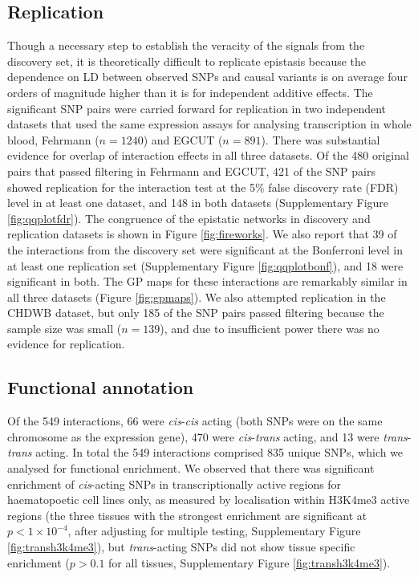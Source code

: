 \documentclass{article}
\begin{document}
\subsection{Replication}
Though a necessary step to establish the veracity of the signals from the discovery set, it is theoretically difficult to replicate epistasis because the dependence on LD between observed SNPs and causal variants is on average four orders of magnitude higher than it is for independent additive effects. The significant SNP pairs were carried forward for replication in two independent datasets that used the same expression assays for analysing transcription in whole blood, Fehrmann ($n=1240$) and EGCUT ($n=891$). There was substantial evidence for overlap of interaction effects in all three datasets. Of the 480 original pairs that passed filtering in Fehrmann and EGCUT, 421 of the SNP pairs showed replication for the interaction test at the 5\% false discovery rate (FDR) level in at least one dataset, and 148 in both datasets (Supplementary Figure \ref{fig:qqplotfdr}). The congruence of the epistatic networks in discovery and replication datasets is shown in Figure \ref{fig:fireworks}. We also report that 39 of the interactions from the discovery set were significant at the Bonferroni level in at least one replication set (Supplementary Figure \ref{fig:qqplotbonf}), and 18 were significant in both. The GP maps for these interactions are remarkably similar in all three datasets (Figure \ref{fig:gpmaps}). We also attempted replication in the CHDWB dataset, but only 185 of the SNP pairs passed filtering because the sample size was small ($n=139$), and due to insufficient power there was no evidence for replication.


\subsection{Functional annotation}
Of the 549 interactions, 66 were \emph{cis}-\emph{cis} acting (both SNPs were on the same chromosome as the expression gene), 470 were \emph{cis}-\emph{trans} acting, and 13 were \emph{trans}-\emph{trans} acting. In total the 549 interactions comprised 835 unique SNPs, which we analysed for functional enrichment. We observed that there was significant enrichment of \emph{cis}-acting SNPs in transcriptionally active regions for haematopoetic cell lines only, as measured by localisation within H3K4me3 active regions (the three tissues with the strongest enrichment are significant at $p < 1 \times 10^{-4}$, after adjusting for multiple testing, Supplementary Figure \ref{fig:transh3k4me3}), but \emph{trans}-acting SNPs did not show tissue specific enrichment ($p > 0.1$ for all tissues, Supplementary Figure \ref{fig:transh3k4me3}). 
\end{document}
